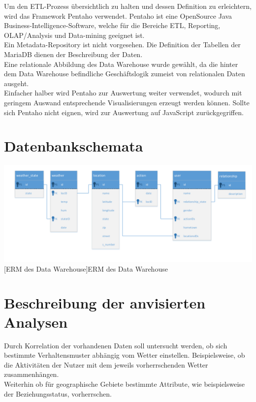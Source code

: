 \documentclass[a4paper,12pt]{scrartcl}
\makeatletter
\def\ScaleIfNeeded{%
\ifdim\Gin@nat@width>\linewidth
\linewidth
\else
\Gin@nat@width
\fi
}
\makeatother
\begin{document}
Um den ETL-Prozess übersichtlich zu halten und dessen Definition zu erleichtern, wird das Framework Pentaho verwendet. Pentaho ist eine OpenSource Java Business-Intelligence-Software, welche für die Bereiche ETL, Reporting, OLAP/Analysis und Data-mining geeignet ist.\\

Ein Metadata-Repository ist nicht vorgesehen. Die Definition der Tabellen der MariaDB dienen der Beschreibung der Daten.\\
Eine relationale Abbildung des Data Warehouse wurde gewählt, da die hinter dem Data Warehouse befindliche Geschäftslogik zumeist von relationalen Daten ausgeht.\\

Einfacher halber wird Pentaho zur Auswertung weiter verwendet, wodurch mit geringem Auswand entsprechende Visualisierungen erzeugt werden können. Sollte sich Pentaho nicht eignen, wird zur Auswertung auf JavaScript zurückgegriffen.


\section{Datenbankschemata}



\begin{center}
\centering
\includegraphics[width=\ScaleIfNeeded]{../Data_Warehouse_ERM.pdf}%
[ERM des Data Warehouse]{ERM des Data Warehouse}%
\end{center}




\section{Beschreibung der anvisierten Analysen}

Durch Korrelation der vorhandenen Daten soll untersucht werden, ob sich bestimmte Verhaltensmuster abhängig vom Wetter einstellen. Beispielsweise, ob die Aktivitäten der Nutzer mit dem jeweils vorherrschenden Wetter zusammenhängen.\\
Weiterhin ob für geographische Gebiete bestimmte Attribute, wie beispielsweise der Beziehungsstatus, vorherrschen.
\end{document}
